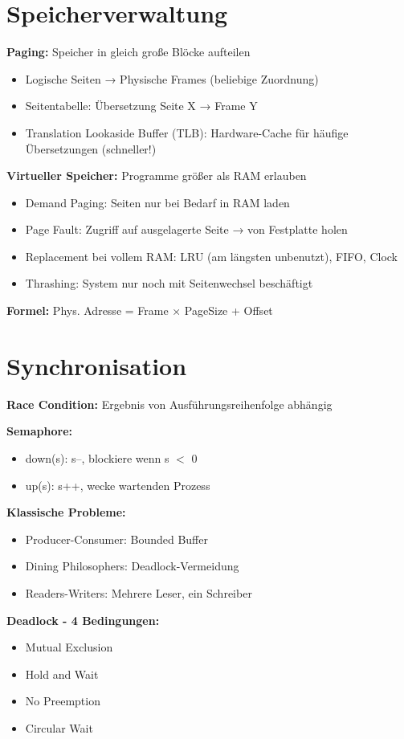 \documentclass[10pt,a4paper]{article}
\begin{document}
\begin{multicols}{2}
\section{Speicherverwaltung}
\textbf{Paging:} Speicher in gleich große Blöcke aufteilen
\begin{itemize}
\item Logische Seiten → Physische Frames (beliebige Zuordnung)
\item Seitentabelle: Übersetzung Seite X → Frame Y
\item Translation Lookaside Buffer (TLB): Hardware-Cache für häufige Übersetzungen (schneller!)
\end{itemize}
\textbf{Virtueller Speicher:} Programme größer als RAM erlauben
\begin{itemize}
\item Demand Paging: Seiten nur bei Bedarf in RAM laden
\item Page Fault: Zugriff auf ausgelagerte Seite → von Festplatte holen
\item Replacement bei vollem RAM: LRU (am längsten unbenutzt), FIFO, Clock
\item Thrashing: System nur noch mit Seitenwechsel beschäftigt
\end{itemize}
\textbf{Formel:} Phys. Adresse = Frame × PageSize + Offset

\section{Synchronisation}
\textbf{Race Condition:} Ergebnis von Ausführungsreihenfolge abhängig

\textbf{Semaphore:}
\begin{itemize}
\item down(s): s--, blockiere wenn s $<$ 0
\item up(s): s++, wecke wartenden Prozess
\end{itemize}

\textbf{Klassische Probleme:}
\begin{itemize}
\item Producer-Consumer: Bounded Buffer
\item Dining Philosophers: Deadlock-Vermeidung
\item Readers-Writers: Mehrere Leser, ein Schreiber
\end{itemize}

\textbf{Deadlock - 4 Bedingungen:}
\begin{itemize}
\item Mutual Exclusion
\item Hold and Wait
\item No Preemption
\item Circular Wait
\end{itemize}


\end{multicols}
\end{document}
